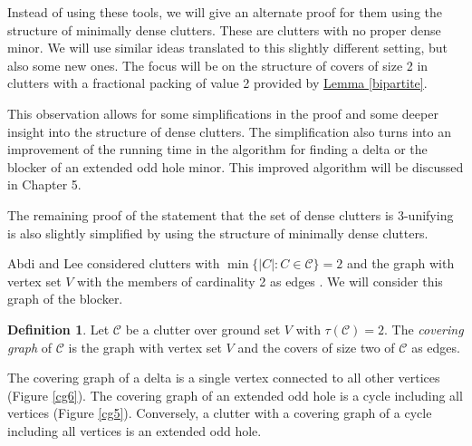 \documentclass[a4paper, 12pt]{scrbook}
\theoremstyle{definition}
\newtheorem*{definition}{Definition}
\begin{document}
   Instead of using these tools, we will give an alternate proof for them using the structure of minimally dense clutters. These are clutters with no proper dense minor.
   We will use similar ideas translated to this slightly different setting, but also some new ones.
   The focus will be on the structure of covers of size 2 in clutters with a fractional packing of value 2 provided by \hyperref[bipartite]{Lemma \ref*{bipartite}}.

   This observation allows for some simplifications in the proof and some deeper insight into the structure of dense clutters.
   The simplification also turns into an improvement of the running time in the algorithm for finding a delta or the blocker of an extended odd hole minor. This improved algorithm will be discussed in Chapter 5.

The remaining proof of the statement that the set of dense clutters is 3-unifying is also slightly simplified by using the structure of minimally dense clutters.

Abdi and Lee considered clutters with $\min\{|C|:C\in \mathcal{C}\}=2$ and the graph with vertex set $V$ with the members of cardinality 2 as edges \cite{deltas}. We will consider this graph of the blocker.

   \begin{definition}
       Let $\mathcal{C}$ be a clutter over ground set $V$ with $\tau(\mathcal{C})=2$.
       The \emph{covering graph} of $\mathcal{C}$ is the graph with vertex set $V$ and the covers of size two of $\mathcal{C}$ as edges.
   \end{definition}
   The covering graph of a delta is a single vertex connected to all other vertices (Figure \ref*{cg6}).
   The covering graph of an extended odd hole is a cycle including all vertices (Figure \ref*{cg5}). Conversely, a clutter with a covering graph of a cycle including all vertices is an extended odd hole.
\end{document}
